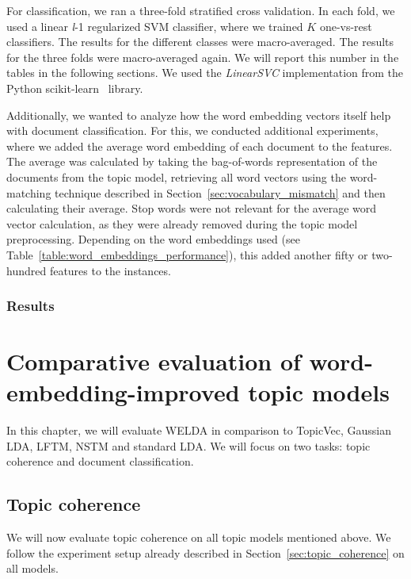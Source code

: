 \documentclass[
        a4paper,
        titlepage,
        twoside,
        parskip,
        numbers=noenddot
        ]{scrbook}
\theoremstyle{break}
\begin{document}
For classification, we ran a three-fold stratified cross validation.
In each fold, we used a linear \emph{l}-1 regularized SVM classifier, where we trained $K$ one-vs-rest classifiers.
The results for the different classes were macro-averaged.
The results for the three folds were macro-averaged again.
We will report this number in the tables in the following sections.
We used the \emph{LinearSVC} implementation from the Python scikit-learn~\cite{Pedregosa2012} library.

Additionally, we wanted to analyze how the word embedding vectors itself help with document classification.
For this, we conducted additional experiments, where we added the average word embedding of each document to the features.
The average was calculated by taking the bag-of-words representation of the documents from the topic model, retrieving all word vectors using the word-matching technique described in Section~\ref{sec:vocabulary_mismatch} and then calculating their average.
Stop words were not relevant for the average word vector calculation, as they were already removed during the topic model preprocessing.
Depending on the word embeddings used (see Table~\ref{table:word_embeddings_performance}), this added another fifty or two-hundred features to the instances.

\subsection{Results}



\chapter{Comparative evaluation of word-embedding-improved topic models}
\label{sec:comparative_evaluation}

In this chapter, we will evaluate WELDA in comparison to TopicVec, Gaussian LDA, LFTM, NSTM and standard LDA.
We will focus on two tasks: topic coherence and document classification.

\section{Topic coherence}
\label{sec:evaluation_topic_coherence}

We will now evaluate topic coherence on all topic models mentioned above.
We follow the experiment setup already described in Section~\ref{sec:topic_coherence} on all models.
\end{document}
